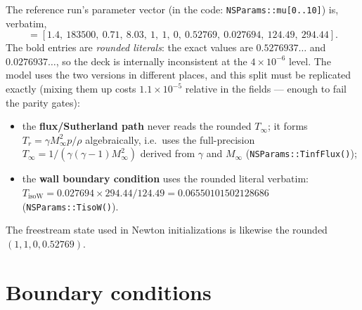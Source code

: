 \documentclass[11pt]{article}
\newcommand{\Minf}{M_\infty}
\newcommand{\Rey}{\mathrm{Re}}
\newcommand{\Pran}{\mathrm{Pr}}
\newcommand{\code}[1]{\texttt{#1}}
\begin{document}
The reference run's parameter vector (in the code:
\code{NSParams::mu[0..10]}) is, verbatim,
\begin{equation*}
[\gamma,\ \Rey,\ \Pran,\ \Minf,\ \rho_\infty,\ (\rho u)_\infty,\
(\rho v)_\infty,\ (\rho E)_\infty,\ T_\infty,\ T_{\mathrm{ref}},\
T_{\mathrm{wall}}]
\end{equation*}
\begin{equation*}
= [1.4,\ 183500,\ 0.71,\ 8.03,\ 1,\ 1,\ 0,\
\mathbf{0.52769},\ \mathbf{0.027694},\ 124.49,\ 294.44].
\end{equation*}
The bold entries are \emph{rounded literals}: the exact values are
$0.5276937\ldots$ and $0.0276937\ldots$, so the deck is internally
inconsistent at the $4\times10^{-6}$ level. The model uses the two versions
in different places, and this split must be replicated exactly (mixing them
up costs $1.1\times10^{-5}$ relative in the fields --- enough to fail the
parity gates):
\begin{itemize}
\item the \textbf{flux/Sutherland path} never reads the rounded
$T_\infty$; it forms $T_r = \gamma\Minf^2 p/\rho$ algebraically, i.e.\ uses
the full-precision $T_\infty = 1/(\gamma(\gamma-1)\Minf^2)$ derived from
$\gamma$ and $\Minf$ (\code{NSParams::TinfFlux()});
\item the \textbf{wall boundary condition} uses the rounded literal
verbatim:
$T_{\mathrm{isoW}} = 0.027694 \times 294.44 / 124.49
= 0.06550101502128686$ (\code{NSParams::TisoW()}).
\end{itemize}
The freestream state used in Newton initializations is likewise the rounded
$(1, 1, 0, 0.52769)$.

\section{Boundary conditions}
\label{sec:bcs}
\end{document}

